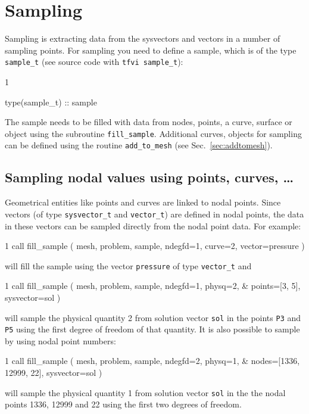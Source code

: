 \section{Sampling}
\label{sec:sample}

Sampling is extracting data from the sysvectors and vectors in a number
of sampling points. For sampling you need to define a sample, which is of the
type \texttt{sample\_t} (see source code with \texttt{tfvi sample\_t}):
\begin{listing}{1}

  type(sample_t) :: sample

\end{listing}
The sample needs to be filled with data from nodes, points, a curve, surface or
object using the subroutine \texttt{fill\_sample}.
Additional curves, objects for
sampling can be defined using the routine \texttt{add\_to\_mesh} (see
Sec.~\ref{sec:addtomesh}).

\subsection{Sampling nodal values using points, curves, \ldots}

Geometrical entities like points and curves are linked to nodal points. Since
vectors (of type \texttt{sysvector\_t} and \texttt{vector\_t}) are defined in
nodal points, the data in these vectors can be sampled directly from the nodal
point data. For example:
\begin{listing}{1}
  call fill_sample ( mesh, problem, sample, ndegfd=1, curve=2, vector=pressure )
\end{listing}
will fill the sample using the vector \texttt{pressure} of type
\texttt{vector\_t} and
\begin{listing}{1}
  call fill_sample ( mesh, problem, sample, ndegfd=1, physq=2, &
    points=[3, 5], sysvector=sol )
\end{listing}
will sample the physical quantity 2 from solution vector \texttt{sol} in the
points \texttt{P3} and \texttt{P5} using the first degree of freedom of that
quantity. It is also possible to sample by using nodal point numbers:
\begin{listing}{1}
  call fill_sample ( mesh, problem, sample, ndegfd=2, physq=1, &
    nodes=[1336, 12999, 22], sysvector=sol )
\end{listing}
will sample the physical quantity 1 from solution vector \texttt{sol} in the
the nodal points 1336, 12999 and 22 using the first two degrees of freedom.

